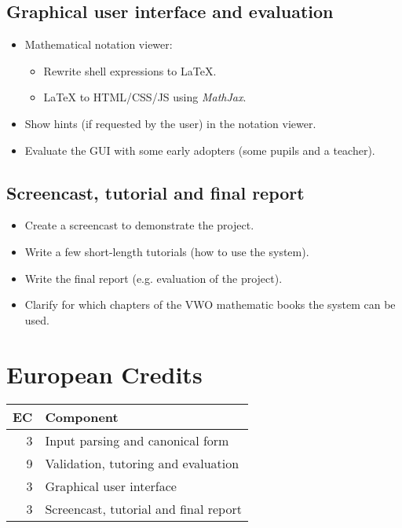 \documentclass[10pt,a4paper]{article}
\begin{document}
\subsection{Graphical user interface and evaluation}

\begin{itemize}
    \item Mathematical notation viewer:
    \begin{itemize}
        \item Rewrite shell expressions to \LaTeX.
        \item \LaTeX $ $ to HTML/CSS/JS using \emph{MathJax}.
    \end{itemize}
    \item Show hints (if requested by the user) in the notation viewer.
    \item Evaluate the GUI with some early adopters (some pupils and a teacher).
\end{itemize}

\subsection{Screencast, tutorial and final report}

\begin{itemize}
    \item Create a screencast to demonstrate the project.
    \item Write a few short-length tutorials (how to use the system).
    \item Write the final report (e.g. evaluation of the project).
    \item Clarify for which chapters of the VWO mathematic books the system can
    be used.
\end{itemize}

\section{European Credits}

\begin{tabular}{rl}
\toprule
EC & Component \\
\midrule
3  & Input parsing and canonical form \\
9  & Validation, tutoring and evaluation \\
3  & Graphical user interface \\
3  & Screencast, tutorial and final report \\
\bottomrule
\end{tabular}
\end{document}
